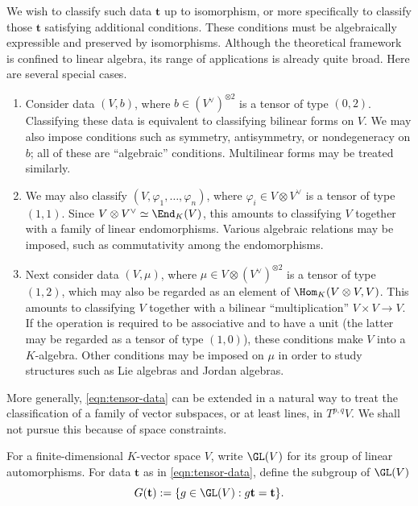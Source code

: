 We wish to classify such data $\mathbf{t}$ up to isomorphism, or more
specifically to classify those $\mathbf{t}$ satisfying additional
conditions. These conditions must be algebraically expressible and preserved
by isomorphisms. Although the theoretical framework is confined to linear
algebra, its range of applications is already quite broad. Here are several
special cases.
\begin{enumerate}
	\item Consider data $(V,b)$, where
	$b\in(V^\vee)^{\otimes2}$ is a tensor of type $(0,2)$. Classifying these
	data is equivalent to classifying bilinear forms on $V$. We may also impose
	conditions such as symmetry, antisymmetry, or nondegeneracy on $b$; all of
	these are ``algebraic'' conditions. Multilinear forms may be treated
	similarly.
	\item We may also classify $(V,\varphi_1,\ldots,\varphi_n)$, where
	$\varphi_i\in V\otimes V^\vee$ is a tensor of type $(1,1)$. Since
	$V\otimes V^\vee\simeq\End_K(V)$, this amounts to classifying $V$ together
	with a family of linear endomorphisms. Various algebraic relations may be
	imposed, such as commutativity among the endomorphisms.
	\item Next consider data $(V,\mu)$, where
	$\mu\in V\otimes(V^\vee)^{\otimes2}$ is a tensor of type $(1,2)$, which may
	also be regarded as an element of $\Hom_K(V\otimes V,V)$. This amounts to
	classifying $V$ together with a bilinear ``multiplication''
	$V\times V\to V$. If the operation is required to be associative and to
	have a unit (the latter may be regarded as a tensor of type $(1,0)$), these
	conditions make $V$ into a $K$-algebra. Other conditions may be imposed on
	$\mu$ in order to study structures such as Lie algebras and Jordan
	algebras.
\end{enumerate}

More generally, \eqref{eqn:tensor-data} can be extended in a natural way to
treat the classification of a family of vector subspaces, or at least lines,
in $T^{p,q}V$. We shall not pursue this because of space constraints.

\begin{definition}
	For a finite-dimensional $K$-vector space $V$, write $\GL(V)$ for its group
	of linear automorphisms. For data $\mathbf{t}$ as in
	\eqref{eqn:tensor-data}, define the subgroup of $\GL(V)$
	\[
	G(\mathbf{t}):=\{g\in\GL(V):g\mathbf{t}=\mathbf{t}\}.
	\]
\end{definition}

